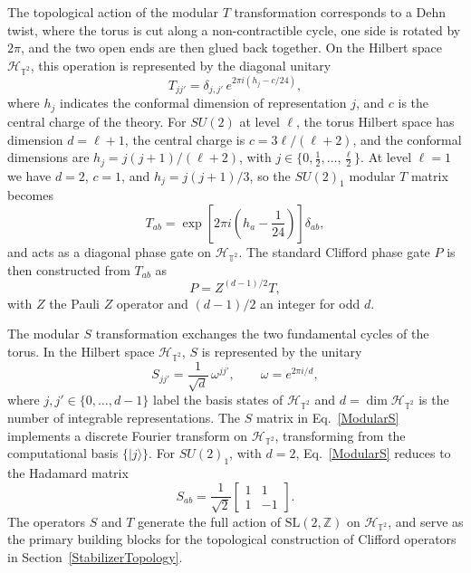 \documentclass[12pt,a4paper]{article}
\def\ket#1{{|{#1}\rangle}}
\begin{document}
The topological action of the modular $T$ transformation corresponds to a Dehn twist, where the torus is cut along a non-contractible cycle, one side is rotated by $2\pi$, and the two open ends are then glued back together. On the Hilbert space $\mathcal{H}_{\mathbb{T}^2}$, this operation is represented by the diagonal unitary
%
\begin{equation}\label{ModularT}
T_{jj'} = \delta_{j,j'}\, e^{2\pi i(h_j - c/24)},
\end{equation}
%
where $h_j$ indicates the conformal dimension of representation $j$, and $c$ is the central charge of the theory. For $SU(2)$ at level $\ell$, the torus Hilbert space has dimension $d = \ell + 1$, the central charge is $c = 3\ell/(\ell+2)$, and the conformal dimensions are $h_j = j(j+1)/(\ell+2)$, with $j \in \{0, \frac{1}{2}, \ldots, \frac{\ell}{2}\}$. At level $\ell = 1$ we have $d = 2$, $c = 1$, and $h_j = j(j+1)/3$, so the $SU(2)_1$ modular $T$ matrix becomes
%
\begin{equation}\label{ModularT_SU21}
T_{ab} = \exp\left[2\pi i\left(h_a - \frac{1}{24}\right)\right]\delta_{ab},
\end{equation}
%
and acts as a diagonal phase gate on $\mathcal{H}_{\mathbb{T}^2}$. The standard Clifford phase gate $P$ is then constructed from $T_{ab}$ as
%
\begin{equation}\label{PhaseGate}
P = Z^{(d-1)/2}T,
\end{equation}
%
with $Z$ the Pauli $Z$ operator and $(d-1)/2$ an integer for odd $d$.

The modular $S$ transformation exchanges the two fundamental cycles of the torus. In the Hilbert space $\mathcal{H}_{\mathbb{T}^2}$, $S$ is represented by the unitary
%
\begin{equation}\label{ModularS}
S_{jj'} = \frac{1}{\sqrt{d}}\,\omega^{jj'}, \qquad \omega = e^{2\pi i/d},
\end{equation}
%
where $j, j' \in \{0, \ldots, d-1\}$ label the basis states of $\mathcal{H}_{\mathbb{T}^2}$ and $d = \dim\mathcal{H}_{\mathbb{T}^2}$ is the number of integrable representations. The $S$ matrix in Eq.\ \eqref{ModularS} implements a discrete Fourier transform on $\mathcal{H}_{\mathbb{T}^2}$, transforming from the computational basis $\{\ket{j}\}$. For $SU(2)_1$, with $d = 2$, Eq.\ \eqref{ModularS} reduces to the Hadamard matrix
%
\begin{equation}\label{HadamardMatrix}
S_{ab} = \frac{1}{\sqrt{2}}\begin{bmatrix} 1 & 1\\ 1 & -1 \end{bmatrix}.
\end{equation}
%
The operators $S$ and $T$ generate the full action of $\mathrm{SL}(2,\mathbb{Z})$ on $\mathcal{H}_{\mathbb{T}^2}$, and serve as the primary building blocks for the topological construction of Clifford operators in Section~\ref{StabilizerTopology}.
\end{document}
